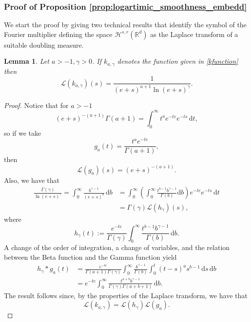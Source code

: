\documentclass[a4paper, leqno, 10pt]{amsart}
\numberwithin{equation}{section}
\newtheorem{lemma}[thm]{Lemma}
\newcommand{\dd}{\mathrm{d}}
\newcommand{\R}{\mathbb{R}}
\begin{document}
\subsubsection*{Proof of Proposition \ref{prop:logartimic_smoothness_embedd}}
We start the proof by giving two technical results that identify the symbol of the Fourier multiplier defining the space $\mathcal{H}^{s,r}(\R^d)$ as the Laplace transform of a suitable doubling measure.  
\begin{lemma}\label{lem:Laplace_trans}
Let $a>-1, \gamma>0$. If $k_{a,\gamma}$ denotes the function given in \eqref{kfunction} then
\[
\mathcal{L}(k_{a,\gamma})(s)=\frac{1}{(e+s)^{a+1}\ln(e+s)^{\gamma} }.
\]
\end{lemma}
\begin{proof}
Notice that for $a>-1$
\[
(e+s)^{-(a+1)}\Gamma(a+1)=\int_0^\infty t^a e^{-te} e^{-ts} \, \dd t,
\]
so if we take 
\begin{equation}\label{eq:g}
g_a(t)=\frac{t^ae^{-te}}{\Gamma(a+1)},
\end{equation}
then 
\[
\mathcal{L}(g_a)(s)=(e+s)^{-(a+1)}.
\]
Also, we have that 
\begin{align*}
\frac{\Gamma(\gamma)}{\ln(e+s)^{\gamma}}=\int_0^\infty \frac{b^{\gamma-1}}{(e+s)^{b}} \, \dd b & =\int_0^\infty \left(\int_0^\infty \frac{t^{b-1}b^{\gamma-1}}{\Gamma(b)} \dd b\right) e^{-te} e^{-ts} \, \dd t\\
&=\Gamma(\gamma)\mathcal{L}(h_\gamma)(s),
\end{align*}
where 
\begin{equation}\label{eq:h}
h_\gamma(t):=\frac{e^{-te}}{\Gamma(\gamma)}\int_0^\infty \frac{t^{b-1} b^{\gamma-1}}{\Gamma(b)} \, \dd b.
\end{equation}
A change of the order of integration, a change of variables, and the relation between the Beta function and the Gamma function yield 
\begin{align*}
h_\gamma*g_a(t) 
& =\frac{e^{-te}}{\Gamma(a+1)\Gamma(\gamma)}\int_0^\infty \frac{b^{\gamma-1}}{\Gamma(b)}\int_0^t (t-s)^as^{b-1} \,  \dd s \,  \dd b\\
&=e^{-te}\int_0^\infty \frac{t^{a+b}b^{\gamma-1}}{\Gamma(\gamma)\Gamma(a+b+1)} \,  \dd b.
\end{align*}
The result follows since, by the properties of the Laplace transform, we have that
\[
\mathcal{L}(k_{a,\gamma})=\mathcal{L}(h_{\gamma})\mathcal{L}(g_a).
\]
\end{proof}
\end{document}
